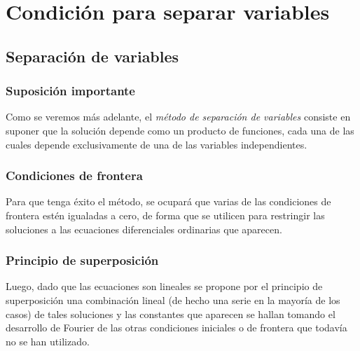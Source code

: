 \documentclass[12pt]{beamer}
\begin{document}
\section{Condición para separar variables}
\subsection{Separación de variables}
\begin{frame}
\frametitle{Suposición importante}
Como se veremos más adelante, el \emph{método de separación de variables} consiste en suponer que la solución depende como un producto de funciones, cada una de las cuales depende exclusivamente de una de las variables independientes.
\end{frame}
\begin{frame}
\frametitle{Condiciones de frontera}
Para que tenga éxito el método, se ocupará que varias de las condiciones de frontera estén igualadas a cero, de forma que se utilicen para restringir las soluciones a las ecuaciones diferenciales ordinarias que aparecen.
\end{frame}
\begin{frame}
\frametitle{Principio de superposición}
Luego, dado que las ecuaciones son lineales se propone por el principio de superposición una combinación lineal (de hecho una serie en la mayoría de los casos) de tales soluciones y las constantes que aparecen se hallan tomando el desarrollo de Fourier de las otras condiciones iniciales o de frontera que todavía no se han utilizado.
\end{frame}
\end{document}

